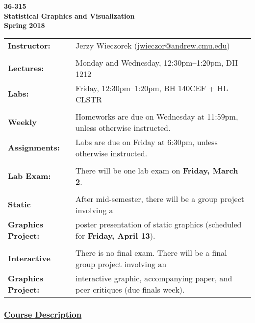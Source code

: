 \documentclass[11pt]{article}
\begin{document}
\begin{center}
{\Large \bf 36-315\\ Statistical Graphics and Visualization}\\
\vspace{11pt}
{\Large {\bf Spring 2018}}%
\end{center}


\noindent \begin{tabular}{ll}
 {\bf Instructor:} 
    & Jerzy Wieczorek (\href{mailto:jwieczor@andrew.cmu.edu}{jwieczor@andrew.cmu.edu})\\

& \\

{\bf Lectures:}
& Monday and Wednesday, 12:30pm--1:20pm, DH 1212\\
{\bf Labs:}
& Friday, 12:30pm--1:20pm, BH 140CEF + HL CLSTR\\

& \\

 {\bf Weekly} & Homeworks are due on Wednesday at 11:59pm, unless otherwise instructed.\\
 {\bf Assignments:}
& Labs are due on Friday at 6:30pm, unless otherwise instructed.\\

& \\

{\bf Lab Exam:} & There will be one lab exam on {\bf Friday, March 2}.\\

& \\

{\bf Static} & After mid-semester, there will be a group project involving a \\
{\bf Graphics Project:}
 & poster presentation of static graphics (scheduled for {\bf Friday, April 13}).\\

& \\

{\bf Interactive} & There is no final exam.  There will be a final group project involving an\\ 
{\bf Graphics Project:} & interactive graphic, accompanying paper, and peer critiques (due finals week).
\end{tabular}


\subsubsection*{\underline{Course Description}}
\end{document}
